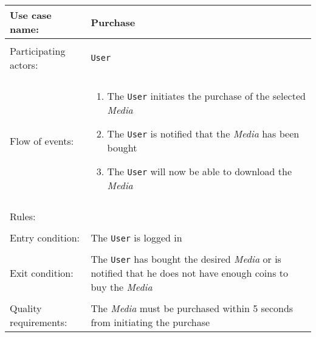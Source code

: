 \documentclass[../report.tex]{subfiles}
\begin{document}
\noindent
\begin{tabular}{ l p{8cm} }                
 Use case name:  & Purchase   \\   \hline \\                
 Participating actors:  & \texttt{User} \\   \hline \\         
 Flow of events: & \begin{enumerate}
\item{The \texttt{User} initiates the purchase of the selected \textit{Media}}
\item{The \texttt{User} is notified that the \textit{Media} has been bought}
\item{The \texttt{User} will now be able to download the \textit{Media}}
\end{enumerate} \\
\hline \\
Rules: & \\ \hline \\
Entry condition: & The \texttt{User} is logged in \\ \hline \\
Exit condition: & The \texttt{User} has bought the desired \textit{Media} or is notified that he does not have enough coins to buy the \textit{Media} \\ \hline \\
Quality requirements: & The \textit{Media} must be purchased within 5 seconds from initiating the purchase \\ \hline             
\end{tabular} \\
\end{document}
